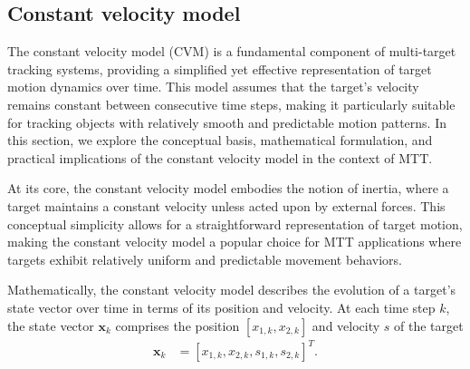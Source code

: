     \subsection{Constant velocity model}
The constant velocity model (CVM) is a fundamental component of multi-target tracking systems, providing a simplified yet effective representation of target motion dynamics over time. This model assumes that the target's velocity remains constant between consecutive time steps, making it particularly suitable for tracking objects with relatively smooth and predictable motion patterns. In this section, we explore the conceptual basis, mathematical formulation, and practical implications of the constant velocity model in the context of MTT.

At its core, the constant velocity model embodies the notion of inertia, where a target maintains a constant velocity unless acted upon by external forces. This conceptual simplicity allows for a straightforward representation of target motion, making the constant velocity model a popular choice for MTT applications where targets exhibit relatively uniform and predictable movement behaviors.

Mathematically, the constant velocity model describes the evolution of a target's state vector over time in terms of
its position and velocity. At each time step $k$, the state vector $\mathbf{x}_k$ comprises the position $[x_{1,k},x_{
    2,k}]$ and velocity $s$ of the target
\begin{align}
    \mathbf{x}_k &= [x_{1,k}, x_{2,k}, s_{1,k}, s_{2,k}]^T.
\end{align}

